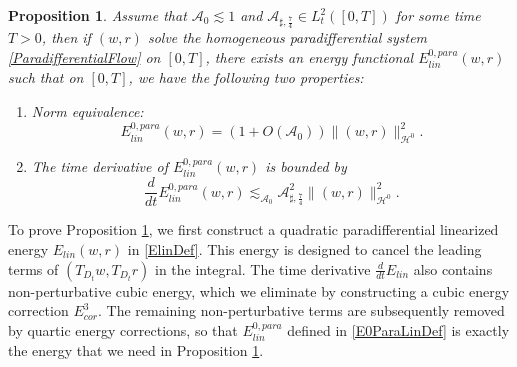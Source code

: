 \documentclass[10pt]{amsart}
\newtheorem{proposition}[theorem]{Proposition}
\theoremstyle{remark}
\theoremstyle{definition}
\numberwithin{equation}{section}
\renewcommand{\H}{{\mathcal H }}
\newcommand{\f}{\frac}
\newcommand{\CalAZ}{{\mathcal{A}_0}}
\newcommand{\ASSharp}{{\mathcal{A}_{\sharp,\frac{7}{4}}^2}}
\begin{document}
\begin{proposition} \label{t:wellposedflow}
Assume that $\mathcal{A}_0
\lesssim 1$ and $\mathcal{A}_{\sharp,\f74}  \in L^2_t([0,T])$ for some time $T>0$, then if $(w,r)$ solve the homogeneous paradifferential system \eqref{ParadifferentialFlow} on $[0,T]$, there exists an  energy functional $E^{0,para}_{lin}(w, r)$ such that on $[0,T]$, we have the following two properties:
\begin{enumerate}
\item Norm equivalence:
\begin{equation*}
    E^{0,para}_{lin}(w, r) = (1+O(\CalAZ)) \|(w,r)\|_{\H^0}^2.
\end{equation*}
\item The time derivative of $E^{0,para}_{lin}(w, r)$ is bounded by
\begin{equation*}
    \frac{d}{dt}  E^{0,para}_{lin}(w, r) \lesssim_{\CalAZ} \ASSharp \|(w,r)\|_{\H^0}^2.
\end{equation*}
\end{enumerate}  
\end{proposition}
To prove Proposition \ref{t:wellposedflow}, we first construct a quadratic paradifferential linearized energy $E_{lin}(w,r)$ in \eqref{ElinDef}.
This energy is designed to cancel the leading terms of $(T_{D_t}w, T_{D_t}r)$ in the integral.
The time derivative $\f{d}{dt}E_{lin}$ also contains non-perturbative cubic energy, which we eliminate by constructing a cubic energy correction $E^3_{cor}$.
The remaining non-perturbative terms are subsequently removed by  quartic energy corrections, so that $ E^{0,para}_{lin}$ defined in \eqref{E0ParaLinDef} is exactly the energy that we need in Proposition \ref{t:wellposedflow}.
\end{document}
